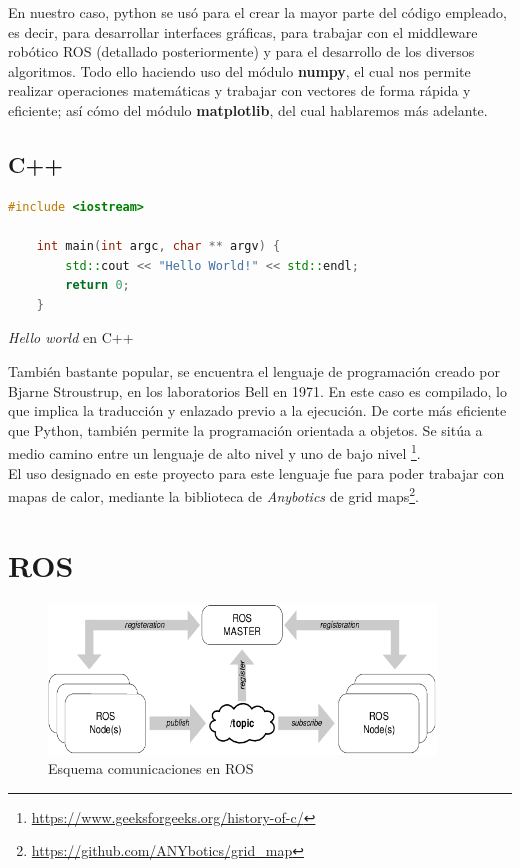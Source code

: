 En nuestro caso, python se usó para el crear la mayor parte del código empleado, es decir, para desarrollar interfaces gráficas, para trabajar con el middleware robótico \ac{ROS} (detallado posteriormente) y para el desarrollo de los diversos algoritmos. Todo ello haciendo uso del módulo \textbf{numpy}, el cual nos permite realizar operaciones matemáticas y trabajar con vectores de forma rápida y eficiente; así cómo del módulo \textbf{matplotlib}, del cual hablaremos más adelante.\\

\subsection{C++}
\label{subsec:cplusplus}

\begin{code}[hp]
	\begin{lstlisting}[language=C++]
	#include <iostream>
	
	int main(int argc, char ** argv) {
		std::cout << "Hello World!" << std::endl;
		return 0;
	}
	\end{lstlisting}
	\caption[Hello world en C++]{\emph{Hello world} en C++}
	\label{cod:helloworld_cplusplus}
\end{code}

También bastante popular, se encuentra el lenguaje de programación creado por Bjarne Stroustrup, en los laboratorios Bell en 1971. En este caso es compilado, lo que implica la traducción y enlazado previo a la ejecución. De corte más eficiente que Python, también permite la programación orientada a objetos. Se sitúa a medio camino entre un lenguaje de alto nivel y uno de bajo nivel \footnote[4]{\url{https://www.geeksforgeeks.org/history-of-c/}}.\\

El uso designado en este proyecto para este lenguaje fue para poder trabajar con mapas de calor, mediante la biblioteca de \emph{Anybotics} de grid maps\footnote[5]{\url{https://github.com/ANYbotics/grid_map}}.

\section{\ac{ROS}}
\label{sec:ros}

\begin{figure} [tp]
	\begin{center}
	\includegraphics[height=4cm]{imagenes/cap3/1_ros_esquema.png}
	\end{center}
	\caption[Esquema de comunicaciones en ROS]{Esquema comunicaciones en ROS}
	\label{fig:ros}
\end{figure}

